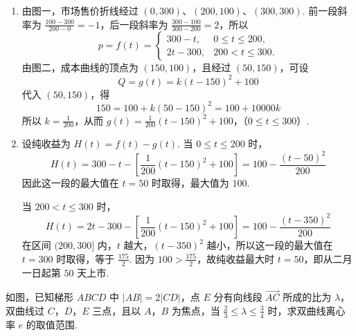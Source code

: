 \begin{solution}
\begin{enumerate}
\item 由图一，市场售价折线经过 \((0,300)\)、\((200,100)\)、\((300,300)\). 前一段斜率为
\(\frac{100-300}{200-0}=-1\)，后一段斜率为
\(\frac{300-100}{300-200}=2\)，所以
\[
p=f(t)=\begin{cases}
300-t,&0\leqslant t\leqslant200,\\
2t-300,&200<t\leqslant300.
\end{cases}
\]
由图二，成本曲线的顶点为 \((150,100)\)，且经过 \((50,150)\)，可设
\[
Q=g(t)=k(t-150)^2+100
\]
代入 \((50,150)\)，得
\[
150=100+k(50-150)^2=100+10000k
\]
所以 \(k=\frac{1}{200}\)，从而
\(g(t)=\frac{1}{200}(t-150)^2+100\)，（\(0\leqslant t\leqslant300\)）.
\item 设纯收益为 \(H(t)=f(t)-g(t)\). 当 \(0\leqslant t\leqslant200\) 时，
\[
H(t)=300-t-\left[\frac{1}{200}(t-150)^2+100\right]
=100-\frac{(t-50)^2}{200}
\]
因此这一段的最大值在 \(t=50\) 时取得，最大值为 \(100\).

当 \(200<t\leqslant300\) 时，
\[
H(t)=2t-300-\left[\frac{1}{200}(t-150)^2+100\right]
=100-\frac{(t-350)^2}{200}
\]
在区间 \((200,300]\) 内，\(t\) 越大，\((t-350)^2\) 越小，所以这一段的最大值在 \(t=300\) 时取得，等于 \(\frac{175}{2}\). 因为 \(100>\frac{175}{2}\)，故纯收益最大时 \(t=50\)，即从二月一日起第 \(50\) 天上市.
\end{enumerate}
\end{solution}

\begin{problem}
如图，已知梯形 \(ABCD\) 中 \(|AB|=2|CD|\)，点 \(E\) 分有向线段 \(\overrightarrow{AC}\) 所成的比为 \(\lambda\)，双曲线过 \(C\)，\(D\)，\(E\) 三点，且以 \(A\)，\(B\) 为焦点，当 \(\frac23\leqslant\lambda\leqslant\frac34\) 时，求双曲线离心率 \(e\) 的取值范围.

\end{problem}

